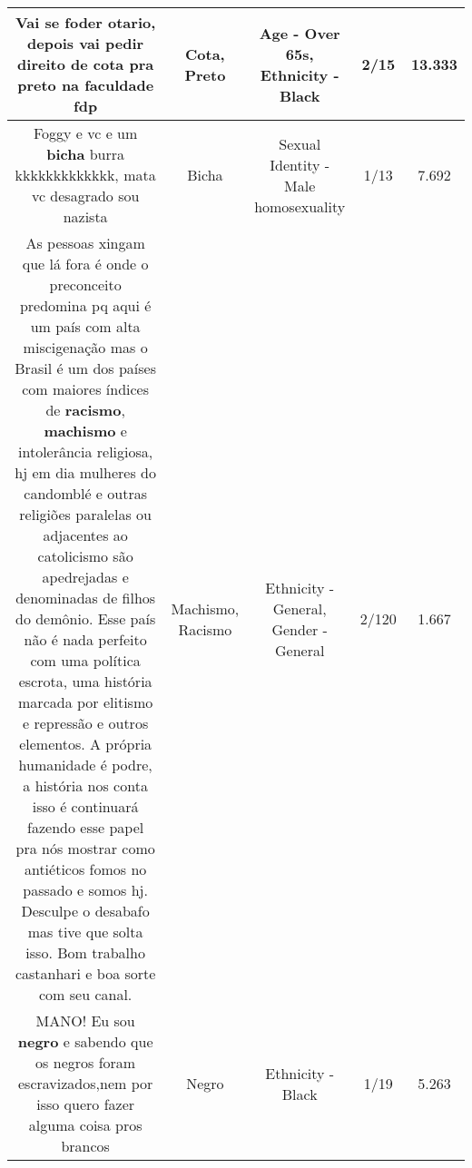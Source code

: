 \documentclass[11pt]{article}
\newlength\mylength
\begin{document}
\begin{center}
\begin{longtable}{|C{.65\mylength}|C{.30\mylength}|C{.12\mylength}|C{.12\mylength}|C{.12\mylength}|}
  \small Vai se foder otario, depois vai pedir direito de \textbf{cota} pra \textbf{preto} na faculdade fdp\normalsize   & Cota, Preto & Age - Over 65s, Ethnicity - Black & 2/15 & 13.333 \\  \hline
  \small Foggy  e vc e um \textbf{bicha} burra kkkkkkkkkkkkk, mata vc desagrado sou nazista\normalsize   & Bicha & Sexual Identity - Male homosexuality & 1/13 & 7.692 \\  \hline
  \small As pessoas xingam que lá fora é onde o preconceito predomina pq aqui é um país com alta miscigenação mas o Brasil é um dos países com maiores índices de \textbf{racismo}, \textbf{machismo} e intolerância religiosa, hj em dia mulheres do candomblé e outras religiões paralelas ou adjacentes ao catolicismo são apedrejadas e denominadas de filhos do demônio. Esse país não é nada perfeito com uma política escrota, uma história marcada por elitismo e repressão e outros elementos. A própria humanidade é podre, a história nos conta isso é continuará fazendo esse papel pra nós mostrar como antiéticos fomos no passado e somos hj. Desculpe o desabafo mas tive que solta isso. Bom trabalho castanhari e boa sorte com seu canal.\normalsize   & Machismo, Racismo & Ethnicity - General, Gender - General & 2/120 & 1.667 \\  \hline
  \small MANO! Eu sou \textbf{negro} e sabendo que os negros foram escravizados,nem por isso quero fazer alguma coisa pros brancos\normalsize   & Negro & Ethnicity - Black & 1/19 & 5.263 \\  \hline

\end{longtable}
\end{center}
\end{document}

